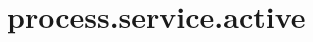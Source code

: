 \section{process.service.active}
\label{configuration:ProcessServiceActive}
\AvailableInCsharpOnly{\TODO}